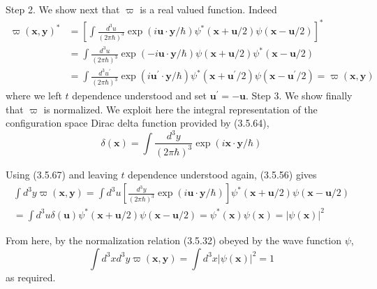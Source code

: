 \documentclass{article}
\begin{document}
Step 2. We show next that $\varpi$ is a real valued function. Indeed
$$
\begin{align*}
\varpi(\boldsymbol{x}, \boldsymbol{y})^{*} & =\left[\int \frac{d^{3} u}{(2 \pi \hbar)^{3}} \exp (i \boldsymbol{u} \cdot \boldsymbol{y} / \hbar) \psi^{*}(\boldsymbol{x}+\boldsymbol{u} / 2) \psi(\boldsymbol{x}-\boldsymbol{u} / 2)\right]^{*}  \tag{3.5.66}\\
& =\int \frac{d^{3} u}{(2 \pi \hbar)^{3}} \exp (-i \boldsymbol{u} \cdot \boldsymbol{y} / \hbar) \psi(\boldsymbol{x}+\boldsymbol{u} / 2) \psi^{*}(\boldsymbol{x}-\boldsymbol{u} / 2) \\
& =\int \frac{d^{3} u^{\prime}}{(2 \pi \hbar)^{3}} \exp \left(i \boldsymbol{u}^{\prime} \cdot \boldsymbol{y} / \hbar\right) \psi^{*}\left(\boldsymbol{x}+\boldsymbol{u}^{\prime} / 2\right) \psi\left(\boldsymbol{x}-\boldsymbol{u}^{\prime} / 2\right)=\varpi(\boldsymbol{x}, \boldsymbol{y})
\end{align*}
$$
where we left $t$ dependence understood and set $\boldsymbol{u}^{\prime}=-\boldsymbol{u}$.
Step 3. We show finally that $\varpi$ is normalized. We exploit here the integral representation of the configuration space Dirac delta function provided by (3.5.64),
$$
\begin{equation*}
\delta(\boldsymbol{x})=\int \frac{d^{3} y}{(2 \pi \hbar)^{3}} \exp (i \boldsymbol{x} \cdot \boldsymbol{y} / \hbar) \tag{3.5.67}
\end{equation*}
$$

Using (3.5.67) and leaving $t$ dependence understood again, (3.5.56) gives
$$
\begin{array}{r}
\int d^{3} y \varpi(\boldsymbol{x}, \boldsymbol{y})=\int d^{3} u\left[\frac{d^{3} y}{(2 \pi \hbar)^{3}} \exp (i \boldsymbol{u} \cdot \boldsymbol{y} / \hbar)\right] \psi^{*}(\boldsymbol{x}+\boldsymbol{u} / 2) \psi(\boldsymbol{x}-\boldsymbol{u} / 2)  \tag{3.5.68}\\
=\int d^{3} u \delta(\boldsymbol{u}) \psi^{*}(\boldsymbol{x}+\boldsymbol{u} / 2) \psi(\boldsymbol{x}-\boldsymbol{u} / 2)=\psi^{*}(\boldsymbol{x}) \psi(\boldsymbol{x})=|\psi(\boldsymbol{x})|^{2}
\end{array}
$$

From here, by the normalization relation (3.5.32) obeyed by the wave function $\psi$,
$$
\begin{equation*}
\int d^{3} x d^{3} y \varpi(\boldsymbol{x}, \boldsymbol{y})=\int d^{3} x|\psi(\boldsymbol{x})|^{2}=1 \tag{3.5.69}
\end{equation*}
$$
as required.
\end{document}
